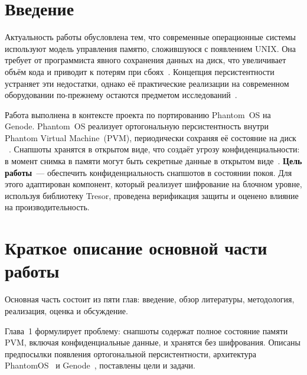 \documentclass[oneside,final,14pt,a4paper]{extreport}
\theoremstyle{definition}
\theoremstyle{remark}
\theoremstyle{remark}
\begin{document}

\setcounter{page}{2}
\tableofcontents

% 
% 
% 

\section{Введение}

Актуальность работы обусловлена тем, что современные операционные системы используют модель управления памятю, сложившуюся с появлением UNIX. Она требует от программиста явного сохранения данных на диск, что увеличивает объём кода и приводит к потерям при сбоях~\cite{PLA}. Концепция персистентности устраняет эти недостатки, однако её практические реализации на современном оборудовании по-прежнему остаются предметом исследований~\cite{Revisited,Aurora}.

Работа выполнена в контексте проекта по портированию Phantom~OS на Genode. Phantom~OS реализует ортогональную персистентность внутри Phantom Virtual Machine~(PVM), периодически сохраняя её состояние на диск ~\cite{Phantom_docs}. Снапшоты хранятся в открытом виде, что создаёт угрозу конфиденциальности: в момент снимка в памяти могут быть секретные данные в открытом виде~\cite{SNIA_PM_Security,VM_Security}. \textbf{Цель работы}~--- обеспечить конфиденциальность снапшотов в состоянии покоя. Для этого адаптирован компонент, который реализует шифрование на блочном уровне, используя библиотеку Tresor, проведена верификация защиты и оценено влияние на производительность.

\section{Краткое описание основной части работы}

Основная часть состоит из пяти глав: введение, обзор литературы, методология, реализация, оценка и обсуждение.

Глава~1 формулирует проблему: снапшоты содержат полное состояние памяти PVM, включая конфиденциальные данные, и хранятся без шифрования. Описаны предпосылки появления ортогональной персистентности, архитектура PhantomOS~\cite{Phantom_docs} и Genode~\cite{Genode_Foundations}, поставлены цели и задачи.
\end{document}
